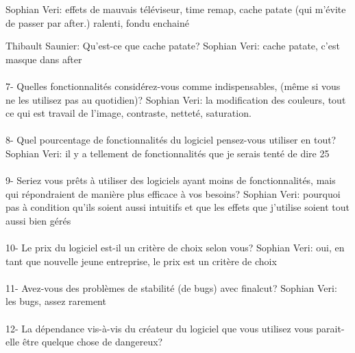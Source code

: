 Sophian Veri: effets de mauvais téléviseur, time remap, cache patate (qui m'évite
de passer par after.) ralenti, fondu enchainé

Thibault Saunier: Qu'est-ce que cache patate?
Sophian Veri: cache patate, c'est masque dans after

\paragraph{}
7-  Quelles fonctionnalités considérez-vous comme indispensables, (même si vous
ne les utilisez pas au quotidien)?
Sophian Veri: la modification des couleurs,  tout ce qui est travail de
l'image, contraste, netteté, saturation.

\paragraph{}
8- Quel pourcentage de fonctionnalités du logiciel pensez-vous utiliser
en tout?
Sophian Veri: il y a  tellement de fonctionnalités que je serais tenté
de dire 25%

\paragraph{}
9- Seriez vous prêts à utiliser des logiciels ayant moins de fonctionnalités,
mais qui répondraient de manière plus efficace à vos besoins?
Sophian Veri: pourquoi pas à condition qu'ils soient aussi intuitifs et que les effets
que j'utilise soient tout aussi bien gérés

\paragraph{}
10-  Le prix du logiciel est-il un critère de choix selon vous?
Sophian Veri: oui, en tant que nouvelle jeune entreprise, le prix est
un critère de choix

\paragraph{}
11- Avez-vous des problèmes de stabilité (de bugs) avec finalcut?
Sophian Veri: les bugs, assez rarement

\paragraph{}
12- La dépendance vis-à-vis du créateur du logiciel que vous utilisez
vous parait-elle être quelque chose de dangereux?


